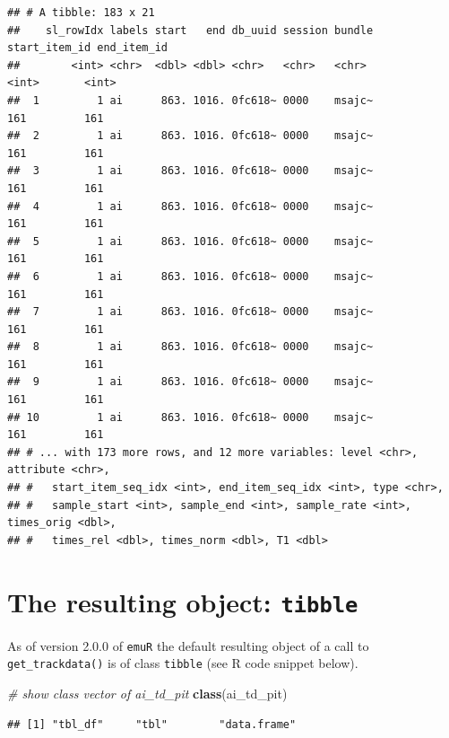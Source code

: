 \documentclass[]{book}
\newenvironment{Shaded}{\begin{snugshade}}{\end{snugshade}}
\newcommand{\CommentTok}[1]{\textcolor[rgb]{0.56,0.35,0.01}{\textit{#1}}}
\newcommand{\KeywordTok}[1]{\textcolor[rgb]{0.13,0.29,0.53}{\textbf{#1}}}
\newcommand{\NormalTok}[1]{#1}
\begin{document}
\begin{verbatim}
## # A tibble: 183 x 21
##    sl_rowIdx labels start   end db_uuid session bundle start_item_id end_item_id
##        <int> <chr>  <dbl> <dbl> <chr>   <chr>   <chr>          <int>       <int>
##  1         1 ai      863. 1016. 0fc618~ 0000    msajc~           161         161
##  2         1 ai      863. 1016. 0fc618~ 0000    msajc~           161         161
##  3         1 ai      863. 1016. 0fc618~ 0000    msajc~           161         161
##  4         1 ai      863. 1016. 0fc618~ 0000    msajc~           161         161
##  5         1 ai      863. 1016. 0fc618~ 0000    msajc~           161         161
##  6         1 ai      863. 1016. 0fc618~ 0000    msajc~           161         161
##  7         1 ai      863. 1016. 0fc618~ 0000    msajc~           161         161
##  8         1 ai      863. 1016. 0fc618~ 0000    msajc~           161         161
##  9         1 ai      863. 1016. 0fc618~ 0000    msajc~           161         161
## 10         1 ai      863. 1016. 0fc618~ 0000    msajc~           161         161
## # ... with 173 more rows, and 12 more variables: level <chr>, attribute <chr>,
## #   start_item_seq_idx <int>, end_item_seq_idx <int>, type <chr>,
## #   sample_start <int>, sample_end <int>, sample_rate <int>, times_orig <dbl>,
## #   times_rel <dbl>, times_norm <dbl>, T1 <dbl>
\end{verbatim}

\hypertarget{the-resulting-object-tibble}{%
\section{\texorpdfstring{The resulting object: \texttt{tibble}}{The resulting object: tibble}}\label{the-resulting-object-tibble}}

As of version 2.0.0 of \texttt{emuR} the default resulting object of a call to \texttt{get\_trackdata()} is of class \texttt{tibble} (see R code snippet below).

\begin{Shaded}
\begin{Highlighting}[]
\CommentTok{# show class vector of ai_td_pit}
\KeywordTok{class}\NormalTok{(ai_td_pit)}
\end{Highlighting}
\end{Shaded}

\begin{verbatim}
## [1] "tbl_df"     "tbl"        "data.frame"
\end{verbatim}
\end{document}
